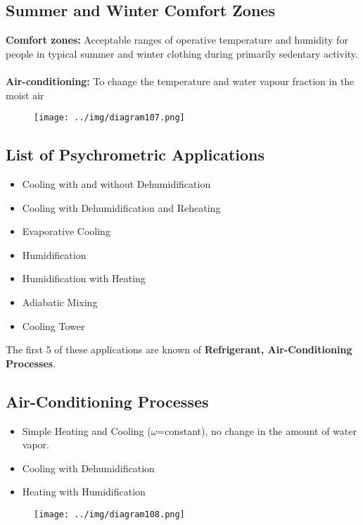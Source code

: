 \documentclass[class=report, crop=false, 12pt,a4paper]{standalone}
\numberwithin{equation}{section}
\begin{document}
\subsection{Summer and Winter Comfort Zones}
\textbf{Comfort zones:} Acceptable ranges of operative temperature and humidity for people in typical summer and winter clothing during primarily sedentary activity. \\\\
\textbf{Air-conditioning:} To change the temperature and water vapour fraction in the moist air
\begin{figure}[H]
  \centering
  \texttt{[image: ../img/diagram107.png]}
  \caption{}
\end{figure}
\subsection{List of Psychrometric Applications}
\begin{itemize}[noitemsep]
  \item Cooling with and without Dehumidification
  \item Cooling with Dehumidification and Reheating
  \item Evaporative Cooling
  \item Humidification
  \item Humidification with Heating
  \item Adiabatic Mixing
  \item Cooling Tower
\end{itemize}
The first 5 of these applications are known of \textbf{Refrigerant, Air-Conditioning Processes}.
\subsection{Air-Conditioning Processes}
\begin{itemize}[noitemsep]
  \item Simple Heating and Cooling ($\omega$=constant), no change in the amount of water vapor.
  \item Cooling with Dehumidification
  \item Heating with Humidification
\end{itemize}
\begin{figure}[H]
  \centering
  \texttt{[image: ../img/diagram108.png]}
  \caption{}
\end{figure}
\end{document}
